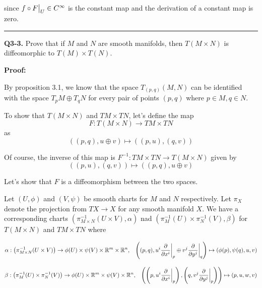 \documentclass{article}
\newcommand{\R}{\mathbb{R}}
\newcommand{\restr}[2]{{%
  \left.\kern-\nulldelimiterspace %
  #1 %
  \vphantom{\big|} %
  \right|_{#2} %
  }}
\begin{document}
since $f \circ \restr{F}{U} \in C^{\infty}$ is the constant map and the derivation of a constant map is zero. 


\vskip 0.5cm
\hrule 
\vskip 0.5cm


\textbf{Q3-3.} Prove that if $M$ and $N$ are smooth manifolds, then $T(M \times N)$ is diffeomorphic to $T(M) \times T(N)$.

\vskip 0.5cm
\textbf{Proof:}

\vskip 0.5cm
By proposition 3.1, we know that the space $T_{(p,q)}\left( M, N \right)$ can be identified with the space $T_{p}M \oplus T_{q}N$ for every pair of points $(p,q)$ where $p \in M, q \in N$.

\vskip 0.5cm
To show that $T(M \times N)$ and $TM \times TN$, let's define the map 
\[ F : T(M \times N) \rightarrow TM \times TN \]
as 
\[ \left( (p,q), u \oplus v  \right) \mapsto \left( (p, u), (q, v) \right) \]

Of course, the inverse of this map is  $F^{-1} : TM \times TN \rightarrow T(M \times N)$ given by 
\[ \left( (p, u), (q, v) \right) \mapsto  \left( (p,q), u \oplus v  \right) \]

Let's show that $F$ is a diffeomorphism between the two spaces.

\vskip 0.5cm
Let $(U, \phi)$ and $(V, \psi)$ be smooth charts for $M$ and $N$ respectively. Let $\pi_X$ denote the projection from $TX \rightarrow X$ for any smooth manifold $X$. We have a corresponding charts $\left(\pi^{-1}_{M \times N}(U \times V), \alpha \right)$ nad $\left(\pi^{-1}_{M}(U) \times \pi^{-1}_{N}(V), \beta \right)$ for $T(M \times N)$ and $TM \times TN$ where 

\[ \alpha : \left(\pi^{-1}_{M \times N}(U \times V) \right) \rightarrow \phi(U) \times \psi(V) \times \R^m \times \R^n, \;\;\; \left( (p, q), u^i \restr{\frac{\partial}{\partial x^i}}{p} \oplus v^j \restr{\frac{\partial}{\partial y^j}}{q} \right) \mapsto \left( \phi(p), \psi(q), u, v \right) \]

\[ \beta : \left(\pi^{-1}_{M}(U) \times \pi^{-1}_{N}(V) \right) \rightarrow \phi(U) \times  \R^m \times \psi(V) \times \R^n, \;\;\; \left( \left( p, u^i \restr{\frac{\partial}{\partial x^i}}{p} \right),  \left( q, v^j \restr{\frac{\partial}{\partial y^j}}{p} \right)  \right) \mapsto \left( p, u, w, v \right) \]
\end{document}
